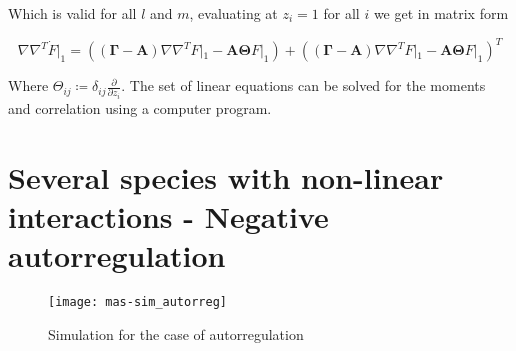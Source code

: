 Which is valid for all $l$ and $m$, evaluating at $z_i=1$ for all $i$ we get in matrix form


\begin{equation}
  \boxed{\nabla\nabla^T\dot{F}|_1 = \left(\left(\mathbf{\Gamma} - \mathbf{A}\right)\nabla\nabla^TF|_1 - \mathbf{A}\mathbf{\Theta} F|_1\right)+\left(\left(\mathbf{\Gamma} - \mathbf{A}\right)\nabla\nabla^TF|_1 - \mathbf{A}\mathbf{\Theta} F|_1\right)^T}
\end{equation}

Where $\Theta_{ij} \coloneqq \delta_{ij}\frac{\partial}{\partial z_i}$. The set of linear equations can be solved for the moments and correlation using a computer program.

\section{Several species with non-linear interactions - Negative autorregulation}

\begin{figure}[H]
  \centering
  \texttt{[image: mas-sim\_autorreg]}
  \caption[Autorregulation simulation results]{\label{fig:mas-sim_autorreg} Simulation for the case of autorregulation}
\end{figure}
